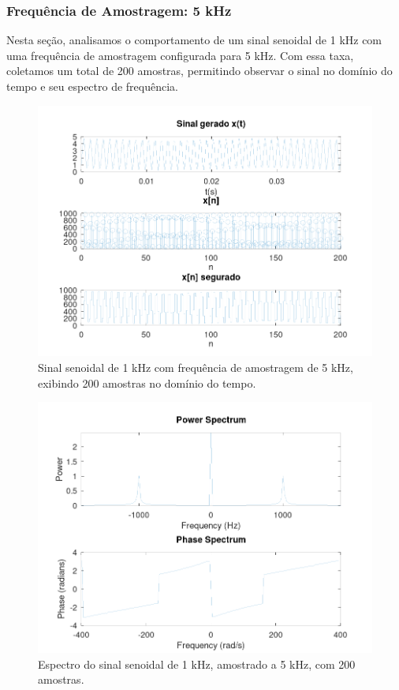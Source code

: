 \subsubsection{Frequência de Amostragem: 5 kHz}

Nesta seção, analisamos o comportamento de um sinal senoidal de 1 kHz com uma frequência de amostragem configurada para 5 kHz. Com essa taxa, coletamos um total de 200 amostras, permitindo observar o sinal no domínio do tempo e seu espectro de frequência.

\begin{figure}[H]
    \centering
    \includegraphics[width=1\linewidth]{03_results/assets/sin__1KHz_fs5k_SIGNAL_200smp.png}
    \caption{Sinal senoidal de 1 kHz com frequência de amostragem de 5 kHz, exibindo 200 amostras no domínio do tempo.}
    \label{fig:signal-5kHz-1kHz-200smp}
\end{figure}

\begin{figure}[H]
    \centering
    \includegraphics[width=1\linewidth]{03_results/assets/sin__1KHz_fs5k_SPECTRUM_200smp.png}
    \caption{Espectro do sinal senoidal de 1 kHz, amostrado a 5 kHz, com 200 amostras.}
    \label{fig:spectrum-5kHz-1kHz-200smp}
\end{figure}

